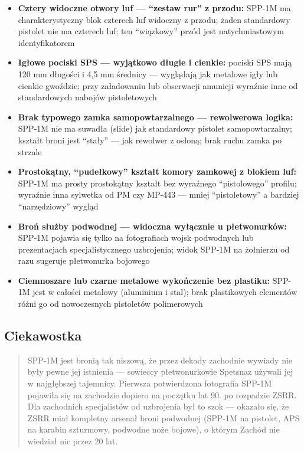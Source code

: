 \documentclass[12pt,oneside]{book}
\providecommand{\tightlist}{%
  \setlength{\itemsep}{0pt}\setlength{\parskip}{0pt}}
\begin{document}
\begin{itemize}
\tightlist
\item
  \textbf{Cztery widoczne otwory luf --- ``zestaw rur'' z przodu:}
  SPP-1M ma charakterystyczny blok czterech luf widoczny z przodu; żaden
  standardowy pistolet nie ma czterech luf; ten ``wiązkowy'' przód jest
  natychmiastowym identyfikatorem
\item
  \textbf{Igłowe pociski SPS --- wyjątkowo długie i cienkie:} pociski
  SPS mają 120 mm długości i 4,5 mm średnicy --- wyglądają jak metalowe
  igły lub cienkie gwoździe; przy załadowaniu lub obserwacji amunicji
  wyraźnie inne od standardowych nabojów pistoletowych
\item
  \textbf{Brak typowego zamka samopowtarzalnego --- rewolwerowa logika:}
  SPP-1M nie ma suwadła (slide) jak standardowy pistolet
  samopowtarzalny; kształt broni jest ``stały'' --- jak rewolwer z
  osłoną; brak ruchu zamka po strzale
\item
  \textbf{Prostokątny, ``pudełkowy'' kształt komory zamkowej z blokiem
  luf:} SPP-1M ma prosty prostokątny kształt bez wyraźnego
  ``pistolowego'' profilu; wyraźnie inna sylwetka od PM czy MP-443 ---
  mniej ``pistoletowy'' a bardziej ``narzędziowy'' wygląd
\item
  \textbf{Broń służby podwodnej --- widoczna wyłącznie u płetwonurków:}
  SPP-1M pojawia się tylko na fotografiach wojsk podwodnych lub
  prezentacjach specjalistycznego uzbrojenia; widok SPP-1M na żołnierzu
  od razu sugeruje płetwonurka bojowego
\item
  \textbf{Ciemnoszare lub czarne metalowe wykończenie bez plastiku:}
  SPP-1M jest w całości metalowy (aluminium i stal); brak plastikowych
  elementów różni go od nowoczesnych pistoletów polimerowych
\end{itemize}

\subsection{Ciekawostka}\label{ciekawostka-114}

\begin{quote}
SPP-1M jest bronią tak niszową, że przez dekady zachodnie wywiady nie
były pewne jej istnienia --- sowieccy płetwonurkowie Spetsnaz używali
jej w najgłębszej tajemnicy. Pierwsza potwierdzona fotografia SPP-1M
pojawiła się na zachodzie dopiero na początku lat 90. po rozpadzie ZSRR.
Dla zachodnich specjalistów od uzbrojenia był to szok --- okazało się,
że ZSRR miał kompletny arsenał broni podwodnej (SPP-1M na pistolet, APS
na karabin szturmowy, podwodne noże bojowe), o którym Zachód nie
wiedział nic przez 20 lat.
\end{quote}
\end{document}
